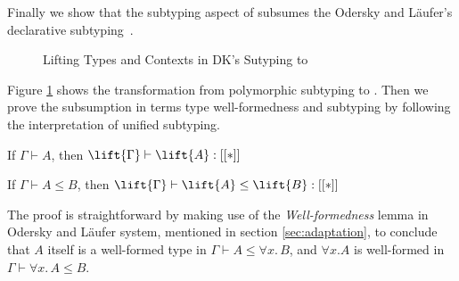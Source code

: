 Finally we show that the subtyping aspect of \name subsumes the Odersky and L\"aufer's declarative
subtyping~\cite{odersky1996putting}.

\begin{figure}
    \caption{Lifting Types and Contexts in DK's Sutyping to \name}
    \label{fig:lift}
\end{figure}

Figure \ref{fig:lift} shows the transformation from polymorphic subtyping to \name.
Then we prove the subsumption in terms type well-formedness and subtyping
by following the interpretation of unified subtyping.

\begin{theorem}
    If $\Gamma \vdash A$, then $\lift{\Gamma} \vdash \lift{A} : [[*]]$
\end{theorem}

\begin{theorem}
    If $\Gamma \vdash A \le B$, then $\lift{\Gamma} \vdash \lift{A} \le \lift{B} : [[*]]$
\end{theorem}

The proof is straightforward by making use of the \emph{Well-formedness} lemma
in Odersky and L\"aufer system, mentioned in section \ref{sec:adaptation}, to conclude that
$A$ itself is a well-formed type in $\Gamma \vdash A \le \forall x.\, B$, and
$\forall x. A$ is well-formed in $\Gamma \vdash \forall x. \, A \le B$.



